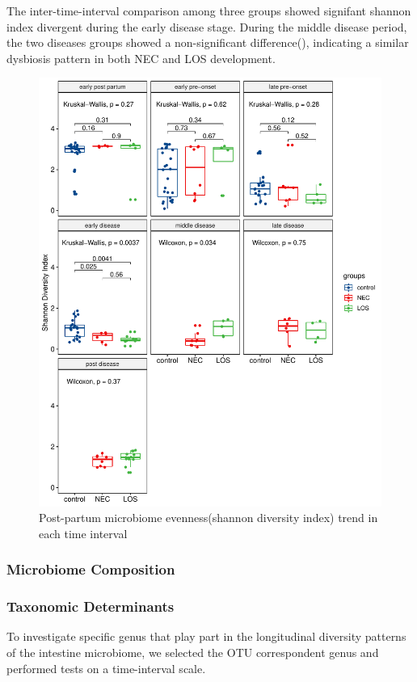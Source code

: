 \documentclass[fleqn,10pt,lineno]{wlpeerj} %
\begin{document}
    \noindent
    The inter-time-interval comparison among three groups showed signifant shannon index divergent during the early disease stage. During the middle disease period, the two diseases groups showed a non-significant difference(), indicating a similar dysbiosis pattern in both NEC and LOS development.
    \begin{figure}[ht]\centering
      \includegraphics[width=\linewidth]{figure/shannon-time-groups.pdf}
      \caption{Post-partum microbiome evenness(shannon diversity index) trend in each time interval}
      \label{fig:shannon-time-groups}
    \end{figure}





    \subsubsection*{Microbiome Composition}

    \subsubsection*{Taxonomic Determinants}
    To investigate specific genus that play part in the longitudinal diversity patterns of the intestine microbiome, we selected the OTU correspondent genus and performed tests on a time-interval scale.
\end{document}
